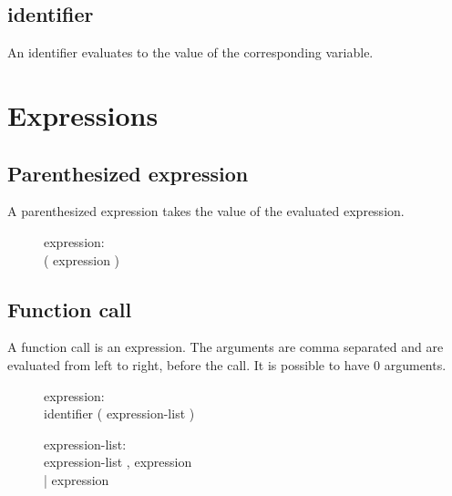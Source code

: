 \documentclass[12pt]{article}
\begin{document}
\subsection{identifier}
An identifier evaluates to the value of the corresponding variable.

\section{Expressions}
\subsection{Parenthesized expression}
A parenthesized expression takes the value of the evaluated expression.
\begin{description}
  \item[]expression: \hfill \\
    ( expression )
\end{description}

\subsection{Function call}
A function call is an expression. The arguments are comma separated and are evaluated
from left to right, before the call. It is possible to have 0 arguments.
\begin{description}
  \item[]expression: \hfill \\
    identifier ( expression-list )
\end{description}

\begin{description}
  \item[]expression-list: \hfill \\
    expression-list , expression \\
    | expression
\end{description}
\end{document}
